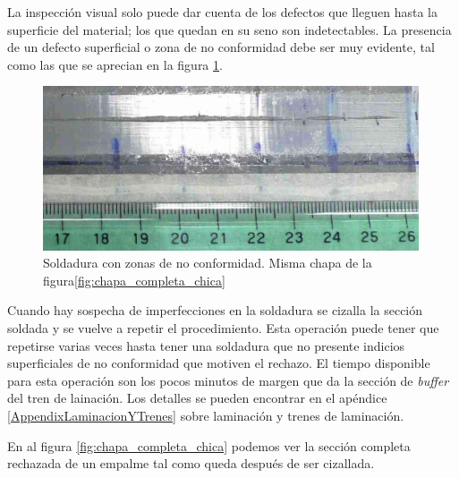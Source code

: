 La inspección visual solo puede dar cuenta de los defectos que lleguen hasta la superficie del material; los que quedan en su seno son indetectables. La presencia de un defecto superficial o zona de no conformidad debe ser muy evidente, tal como las que se aprecian en la figura \ref{fig:foto_soldadura_1}.



\begin{figure}[H]
	\centering
	\includegraphics[width=0.99\textwidth]{./Figures/foto_soldadura_1a.jpg}
	\caption{Soldadura con zonas de no conformidad. Misma chapa de la figura\ref{fig:chapa_completa_chica} }
	\label{fig:foto_soldadura_1} 
\end{figure}

Cuando hay sospecha de imperfecciones en la soldadura se cizalla la sección soldada y se vuelve a repetir el procedimiento. Esta operación puede tener que repetirse varias veces hasta tener una soldadura que no presente indicios superficiales de no conformidad que motiven el rechazo. El tiempo disponible para esta operación son los pocos minutos de margen que da la sección de \textit{buffer} del tren de lainación. Los detalles se pueden encontrar en el apéndice \ref{AppendixLaminacionYTrenes} sobre laminación y trenes de laminación.

En al figura \ref{fig:chapa_completa_chica} podemos ver la sección completa rechazada de un empalme tal como queda después de ser cizallada.


